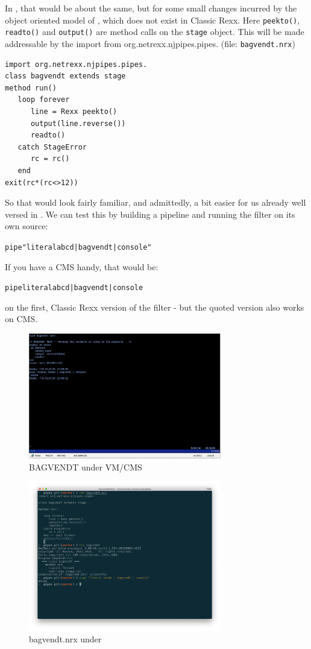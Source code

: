 In \nr{}, that would be about the same, but for some small changes
incurred by the object oriented model of \nr{}, which does not exist in Classic Rexx. Here \texttt{peekto()}, \texttt{readto()} and
\texttt{output()} are method calls on the \texttt{stage} object. This
will be made addressable
by the import from org.netrexx.njpipes.pipes. (file: \texttt{bagvendt.nrx})
\begin{lstlisting}
import org.netrexx.njpipes.pipes.
class bagvendt extends stage
method run()
   loop forever
      line = Rexx peekto()
      output(line.reverse())
      readto()
   catch StageError
      rc = rc()
   end
exit(rc*(rc<>12))
\end{lstlisting}
So that would look fairly familiar, and admittedly, a bit easier for us already well versed in \nr{}.
We can test this by building a pipeline and running the filter on its
own source:
\begin{alltt}
pipe "literal abcd | bagvendt | console"
 \end{alltt}
If you have a CMS handy, that would be:
\begin{alltt}
pipe literal abcd | bagvendt | console
 \end{alltt}
on the first, Classic Rexx version of the filter - but the quoted
version also works on CMS.
\begin{figure}[h]
  \includegraphics[width=0.75\textwidth]{images/vmbagvendt.png}
  \caption{BAGVENDT under VM/CMS}
  \label{fig:vmbagvendt}
\end{figure}\begin{figure}[h]
  \includegraphics[width=0.75\textwidth]{images/nrbagvendt.png}
  \caption{bagvendt.nrx under \nr{}}
  \label{fig:nrbagvendt}
\end{figure}

